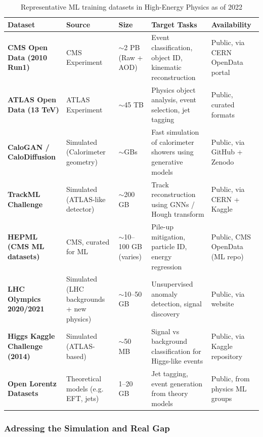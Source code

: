 \documentclass[letterpaper,12pt]{article}
\begin{document}
\begin{spacing}{1.125}
\begin{table}[H]
  \centering
  \caption{Representative ML training datasets in High-Energy Physics as of 2022}
  \begin{tabular}{|p{2cm}|p{2.5cm}|p{2cm}|p{4cm}|p{3cm}|}
    \hline
    \textbf{Dataset} & \textbf{Source} & \textbf{Size} & \textbf{Target Tasks} & \textbf{Availability} \\
    \hline
    \textbf{CMS Open Data (2010 Run1)} & CMS Experiment & $\sim$2 PB (Raw + AOD) & Event classification, object ID, kinematic reconstruction & Public, via CERN OpenData portal \\
    \hline
    \textbf{ATLAS Open Data (13 TeV)} & ATLAS Experiment & $\sim$45 TB & Physics object analysis, event selection, jet tagging & Public, curated formats \\
    \hline
    \textbf{CaloGAN / CaloDiffusion} & Simulated (Calorimeter geometry) & $\sim$GBs & Fast simulation of calorimeter showers using generative models & Public, via GitHub + Zenodo \\
    \hline
    \textbf{TrackML Challenge} & Simulated (ATLAS-like detector) & $\sim$200 GB & Track reconstruction using GNNs / Hough transform & Public, via CERN + Kaggle \\
    \hline
    \textbf{HEPML (CMS ML datasets)} & CMS, curated for ML & $\sim$10–100 GB (varies) & Pile-up mitigation, particle ID, energy regression & Public, CMS OpenData (ML repo) \\
    \hline
    \textbf{LHC Olympics 2020/2021} & Simulated (LHC backgrounds + new physics) & $\sim$10–50 GB & Unsupervised anomaly detection, signal discovery & Public, via website \\
    \hline
    \textbf{Higgs Kaggle Challenge (2014)} & Simulated (ATLAS-based) & $\sim$50 MB & Signal vs background classification for Higgs-like events & Public, via Kaggle repository \\
    \hline
    \textbf{Open Lorentz Datasets} & Theoretical models (e.g. EFT, jets) & 1–20 GB & Jet tagging, event generation from theory models & Public, from physics ML groups \\
    \hline
  \end{tabular}
  \label{tab:hepml_datasets}
\end{table}



\subsubsection{Adressing the Simulation and Real Gap}


\end{spacing}
\end{document}
